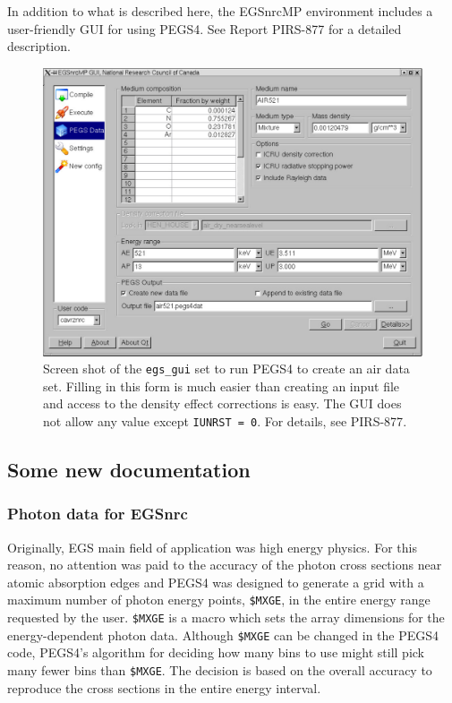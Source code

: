 In addition to what is described here, the EGSnrcMP environment includes
a user-friendly GUI for using PEGS4. See Report PIRS-877\cite{Ka03}
for a detailed description.
\begin{figure}[ht]
   \begin{center}
   \includegraphics[width=12cm]{figures/egs_gui_pegs4_screen}
    \end{center}
   \caption{Screen shot of the {\tt egs\_gui} set to run PEGS4 to create
an air data set. Filling in this form is much easier than creating an input
file and access to the density effect corrections is easy. The GUI
does not allow any value except {\tt IUNRST = 0}. For details, see
PIRS-877\cite{Ka03}. }
   \label{fig_pegs4_screen}
\end{figure}

\subsection{Some new documentation}

\subsubsection{Photon data for EGSnrc}
\label{xsections}
Originally, EGS main field of application was high energy physics.
For this reason, no attention was paid to the accuracy of the 
photon cross sections near atomic absorption edges\cite{RB90} and 
PEGS4 was designed to generate a grid with a maximum number of photon 
energy points, {\tt \$MXGE}, in the entire energy range requested by the user. 
{\tt \$MXGE} is a macro which sets the array dimensions for the energy-dependent
photon data. Although {\tt \$MXGE} can be changed in the PEGS4 code, 
PEGS4's algorithm for deciding how many bins to use might still pick many 
fewer bins than {\tt \$MXGE}. The decision is based on the overall accuracy to 
reproduce the cross sections in the entire energy interval. 

